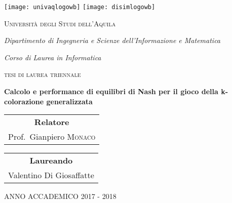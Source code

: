 \begin{titlepage}

\begin{center}

\texttt{[image: univaqlogowb]}
\hfill
\texttt{[image: disimlogowb]}

\vspace{1cm}

{\scshape\Large Università degli Studi dell'Aquila \\}

\vspace{0.5cm}

{\itshape\large Dipartimento di Ingegneria e Scienze dell'Informazione e Matematica \\}

\vspace{0.3cm}

{\itshape\large Corso di Laurea in Informatica \\}

\vspace{1cm}

{\scshape\Large tesi di laurea triennale \\}

\vspace{1cm}

{\huge\bfseries Calcolo e performance di equilibri di Nash per il gioco della k-colorazione generalizzata \\}

\vfill

\begin{tabular}{c}

	\textbf{Relatore} \\
	Prof.~Gianpiero \textsc{Monaco}

\end{tabular}
\hfill
\begin{tabular}{c}

	\textbf{Laureando}\\
	Valentino Di Giosaffatte

\end{tabular}

\vfill

{\scshape\large ANNO ACCADEMICO 2017 - 2018 \\}

\end{center}

\end{titlepage}
